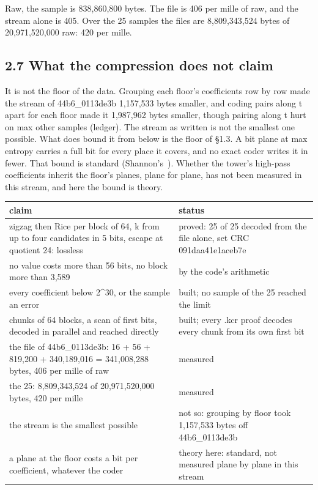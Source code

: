 Raw, the sample is 838,860,800 bytes. The file is 406 per mille of raw, and the stream alone is 405. Over the 25 samples the files are 8,809,343,524 bytes of 20,971,520,000 raw: 420 per mille.

\subsection{\texorpdfstring{2.7 What the compression does not claim}{2.7 What the compression does not claim}}

It is not the floor of the data. Grouping each floor's coefficients row by row made the stream of 44b6\_\allowbreak{}0113de3b 1,157,533 bytes smaller, and coding pairs along t apart for each floor made it 1,987,962 bytes smaller, though pairing along t hurt on max other samples (ledger). The stream as written is not the smallest one possible. What does bound it from below is the floor of §1.3. A bit plane at max entropy carries a full bit for every place it covers, and no exact coder writes it in fewer. That bound is standard (Shannon's~\cite{src:Shannon}). Whether the tower's high-pass coefficients inherit the floor's planes, plane for plane, has not been measured in this stream, and here the bound is theory.

{\small
\setlength{\tabcolsep}{6pt}
\begin{longtable}{>{\RaggedRight\arraybackslash}p{}>{\RaggedRight\arraybackslash}p{}}
\toprule
claim & status \\
\midrule
\endhead
zigzag then Rice per block of 64, k from up to four candidates in 5 bits, escape at quotient 24: lossless & proved: 25 of 25 decoded from the file alone, set CRC 091daa41e1aceb7e \\
no value costs more than 56 bits, no block more than 3,589 & by the code's arithmetic \\
every coefficient below 2\textasciicircum{}30, or the sample an error & built; no sample of the 25 reached the limit \\
chunks of 64 blocks, a scan of first bits, decoded in parallel and reached directly & built; every .kcr proof decodes every chunk from its own first bit \\
the file of 44b6\_\allowbreak{}0113de3b: 16 + 56 + 819,200 + 340,189,016 = 341,008,288 bytes, 406 per mille of raw & measured \\
the 25: 8,809,343,524 of 20,971,520,000 bytes, 420 per mille & measured \\
the stream is the smallest possible & not so: grouping by floor took 1,157,533 bytes off 44b6\_\allowbreak{}0113de3b \\
a plane at the floor costs a bit per coefficient, whatever the coder & theory here: standard, not measured plane by plane in this stream \\
\bottomrule
\end{longtable}
}


